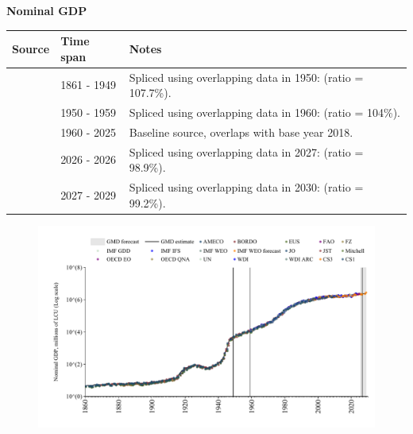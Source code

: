 \documentclass[12pt,a4paper,landscape]{article}
\begin{document}
\begin{adjustbox}{max totalsize={\paperwidth}{\paperheight},center}
\begin{minipage}[t][\textheight][t]{\textwidth}
\vspace*{0.5cm}
{}
\begin{center}
{\Large\bfseries Nominal GDP}
\end{center}
\vspace{0.5cm}
\begin{table}[H]
\centering
\small
\begin{tabular}{|l|l|l|}
\hline
\textbf{Source} & \textbf{Time span} & \textbf{Notes} \\
\hline
\rowcolor{white}\cite{CS1_ITA}& 1861 - 1949 &Spliced using overlapping data in 1950: (ratio = 107.7\%). \\
\rowcolor{lightgray}\cite{IMF_GDD}& 1950 - 1959 &Spliced using overlapping data in 1960: (ratio = 104\%). \\
\rowcolor{white}\cite{OECD_EO}& 1960 - 2025 &Baseline source, overlaps with base year 2018. \\
\rowcolor{lightgray}\cite{AMECO}& 2026 - 2026 &Spliced using overlapping data in 2027: (ratio = 98.9\%). \\
\rowcolor{white}\cite{IMF_WEO_forecast}& 2027 - 2029 &Spliced using overlapping data in 2030: (ratio = 99.2\%). \\
\hline
\end{tabular}
\end{table}
\begin{figure}[H]
\centering
\includegraphics[width=\textwidth,height=0.6\textheight,keepaspectratio]{graphs/ITA_nGDP.pdf}
\end{figure}
\end{minipage}
\end{adjustbox}
\end{document}
